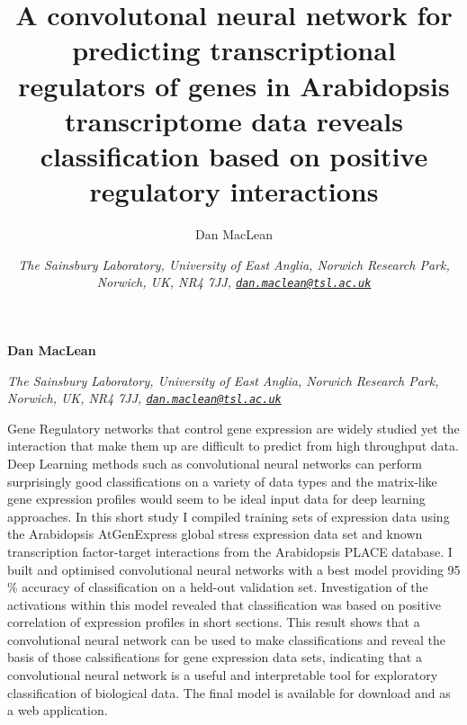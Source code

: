 \documentclass[12pt,a4paper,]{article}
\title{A convolutonal neural network for predicting transcriptional regulators of genes in Arabidopsis transcriptome data reveals classification based on positive regulatory interactions  }
\author{\Large Dan MacLean\vspace{0.05in} \newline\normalsize\emph{}   \and \Large \vspace{0.05in} \newline\normalsize\emph{The Sainsbury Laboratory, University of East Anglia, Norwich Research Park, Norwich, UK, NR4 7JJ, \href{mailto:dan.maclean@tsl.ac.uk}{\nolinkurl{dan.maclean@tsl.ac.uk}}}  }
\date{}
\newcommand*{\authorfont}{\fontfamily{phv}\selectfont}
\renewenvironment{abstract}
 {{%
    \setlength{\leftmargin}{0mm}
    \setlength{\rightmargin}{\leftmargin}%
  }%
  \relax}
 {\endlist}
\begin{document}
	
%

{%
\setlength{\parindent}{0pt}
\thispagestyle{plain}
{\fontsize{18}{20}\selectfont\raggedright 
\maketitle  %

}

{
   \vskip 13.5pt\relax \normalsize\fontsize{11}{12} 
\textbf{\authorfont Dan MacLean} \hskip 15pt \emph{\small }   \par \textbf{\authorfont } \hskip 15pt \emph{\small The Sainsbury Laboratory, University of East Anglia, Norwich Research Park, Norwich, UK, NR4 7JJ, \href{mailto:dan.maclean@tsl.ac.uk}{\nolinkurl{dan.maclean@tsl.ac.uk}}}   

}

}








\begin{abstract}

    \hbox{\vrule height .2pt width 39.14pc}

    \vskip 8.5pt %

\noindent Gene Regulatory networks that control gene expression are widely studied yet the interaction that make them up are difficult to predict from high throughput data. Deep Learning methods such as convolutional neural networks can perform surprisingly good classifications on a variety of data types and the matrix-like gene expression profiles would seem to be ideal input data for deep learning approaches. In this short study I compiled training sets of expression data using the Arabidopsis AtGenExpress global stress expression data set and known transcription factor-target interactions from the Arabidopsis PLACE database. I built and optimised convolutional neural networks with a best model providing 95 \% accuracy of classification on a held-out validation set. Investigation of the activations within this model revealed that classification was based on positive correlation of expression profiles in short sections. This result shows that a convolutional neural network can be used to make classifications and reveal the basis of those calssifications for gene expression data sets, indicating that a convolutional neural network is a useful and interpretable tool for exploratory classification of biological data. The final model is available for download and as a web application.


    \hbox{\vrule height .2pt width 39.14pc}


\end{abstract}
\end{document}
